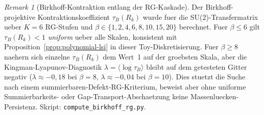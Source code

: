 \documentclass[12pt,a4paper]{article}
\theoremstyle{definition}
\theoremstyle{plain}
\theoremstyle{remark}
\newtheorem{remark}[definition]{Remark}
\begin{document}
\begin{remark}[Birkhoff-Kontraktion entlang der RG-Kaskade]
\label{rem:birkhoff-numerics}
Der Birkhoff-projektive Kontraktionskoeffizient $\tau_B(R_k)$ wurde fuer die SU(2)-Transfermatrix ueber $K=6$ RG-Stufen und $\beta \in \{1, 2, 4, 6, 8, 10, 15, 20\}$ berechnet. Fuer $\beta \leq 6$ gilt $\tau_B(R_k) < 1$ \emph{uniform} ueber alle Skalen, konsistent mit Proposition~\ref{prop:polynomial-lsi} in dieser Toy-Diskretisierung. Fuer $\beta \geq 8$ naehern sich einzelne $\tau_B(R_k)$ dem Wert~1 auf der groebsten Skala, aber die Kingman-Lyapunov-Diagnostik $\lambda = \langle \log \tau_B \rangle$ bleibt auf dem getesteten Gitter negativ ($\lambda \approx -0{,}18$ bei $\beta=8$, $\lambda \approx -0{,}04$ bei $\beta=10$). Dies stuetzt die Suche nach einem summierbaren-Defekt-RG-Kriterium, beweist aber ohne uniforme Summierbarkeits- oder Gap-Transport-Abschaetzung keine Massenluecken-Persistenz. Skript: \texttt{compute\_birkhoff\_rg.py}.
\end{remark}

\end{document}
